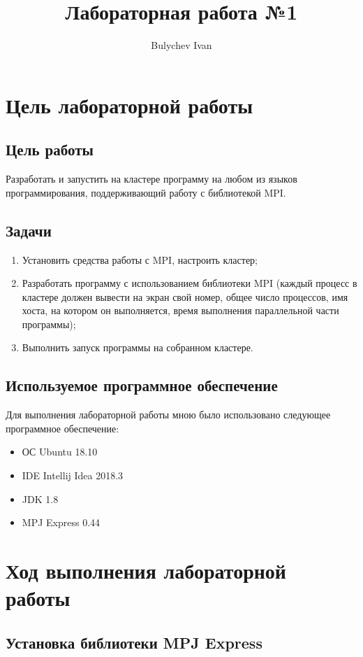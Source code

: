\documentclass[titlepage,oneside,final,14pt]{extarticle} %
\author{Bulychev Ivan}
\title{Лабораторная работа №1}
\begin{document}
	

\setcounter{page}{2}
%

\section{Цель лабораторной работы}

\subsection{Цель работы}

Разработать и запустить на кластере программу на любом из языков программирования, поддерживающий работу с библиотекой MPI.

\subsection{Задачи}

\begin{enumerate}
	\item Установить средства работы с MPI, настроить кластер;
	\item Разработать программу с использованием библиотеки MPI	(каждый процесс в кластере должен вывести на экран свой номер, общее число процессов, имя хоста, на котором он выполняется, время выполнения параллельной части программы);
	\item Выполнить запуск программы на собранном кластере.
\end{enumerate}

\subsection{Используемое программное обеспечение}

Для выполнения лабораторной работы мною было использовано следующее программное обеспечение:
\begin{itemize}
	\item ОС Ubuntu 18.10
	\item IDE Intellij Idea 2018.3
	\item JDK 1.8
	\item MPJ Express 0.44
\end{itemize}

\section{Ход выполнения лабораторной работы}

\subsection{Установка библиотеки MPJ Express}
\end{document}
